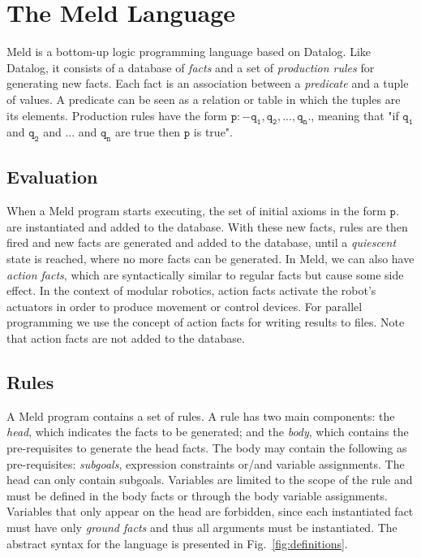 \documentclass[preprint]{sigplanconf}
\begin{document}
\section{The Meld Language}

Meld is a bottom-up logic programming language based on Datalog. Like Datalog, it
consists of a database of \emph{facts} and a set of \emph{production rules} for generating new facts.
Each fact is an association between a \emph{predicate} and a tuple of values. A predicate can be seen
as a relation or table in which the tuples are its elements. Production rules have the form
$\mathtt{p :- q_1, q_2, ..., q_n.}$, meaning that "if $\mathtt{q_1}$ and $\mathtt{q_2}$ and ... and
$\mathtt{q_n}$ are true then $\mathtt{p}$ is true".

\subsection{Evaluation}

When a Meld program starts executing, the set of initial axioms in the form $\mathtt{p.}$ are
instantiated and added to the database. With these new facts, rules are then fired and new
facts are generated and added to the database, until a \emph{quiescent} state is reached, where
no more facts can be generated. In Meld, we can also have \emph{action facts},
which are syntactically similar to regular facts but cause some side effect. In the context of
modular robotics, action facts activate the robot's actuators in order to produce movement
or control devices. For parallel programming we use the concept of action facts for writing
results to files. Note that action facts are not added to the database.

\subsection{Rules}

A Meld program contains a set of rules. A rule has two main components: the \emph{head},
which indicates the facts to be generated; and the \emph{body}, which contains the pre-requisites
to generate the head facts. The body may contain the following as pre-requisites: \emph{subgoals},
expression constraints or/and variable assignments. The head can only contain subgoals.
Variables are limited to the scope of the rule and must be defined in the body facts or through
the body variable assignments. Variables that only appear on the head are forbidden, since each
instantiated fact must have only \emph{ground facts} and thus all arguments must be instantiated.
The abstract syntax for the language is presented in Fig.~\ref{fig:definitions}.
\end{document}
